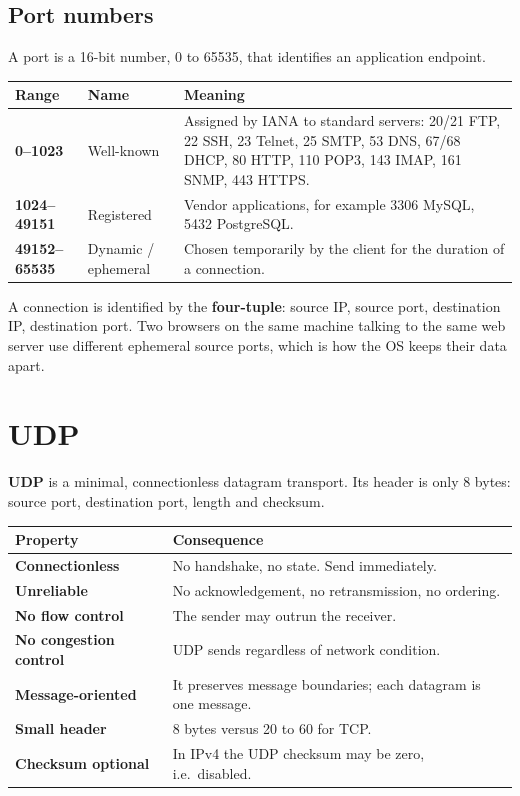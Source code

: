 \documentclass[11pt,a4paper]{article}
\begin{document}
\subsection{Port numbers}

A port is a 16-bit number, 0 to 65535, that identifies an application endpoint.

\begin{center}\small
\begin{tabularx}{\textwidth}{>{\bfseries}p{} p{} X}
\toprule Range & Name & Meaning\\
\midrule
0--1023 & Well-known & Assigned by IANA to standard servers: 20/21 FTP, 22 SSH, 23 Telnet, 25 SMTP, 53 DNS, 67/68 DHCP, 80 HTTP, 110 POP3, 143 IMAP, 161 SNMP, 443 HTTPS.\\
1024--49151 & Registered & Vendor applications, for example 3306 MySQL, 5432 PostgreSQL.\\
49152--65535 & Dynamic / ephemeral & Chosen temporarily by the client for the duration of a connection.\\
\bottomrule
\end{tabularx}
\end{center}

\begin{rememberbox}
A connection is identified by the \textbf{four-tuple}: source IP, source port, destination IP, destination port. Two browsers on the same machine talking to the same web server use different ephemeral source ports, which is how the OS keeps their data apart.
\end{rememberbox}

\section{UDP}

\textbf{UDP} is a minimal, connectionless datagram transport. Its header is only 8 bytes: source port, destination port, length and checksum.

\begin{center}\small
\begin{tabularx}{\textwidth}{>{\bfseries}p{} X}
\toprule Property & Consequence\\
\midrule
Connectionless & No handshake, no state. Send immediately.\\
Unreliable & No acknowledgement, no retransmission, no ordering.\\
No flow control & The sender may outrun the receiver.\\
No congestion control & UDP sends regardless of network condition.\\
Message-oriented & It preserves message boundaries; each datagram is one message.\\
Small header & 8 bytes versus 20 to 60 for TCP.\\
Checksum optional & In IPv4 the UDP checksum may be zero, i.e.\ disabled.\\
\bottomrule
\end{tabularx}
\end{center}
\end{document}
